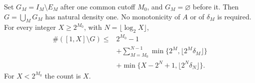 \begin{theorem}
Set \(G_M=I_M\setminus E_M\) after one common cutoff \(M_0\), and
\(G_M=\varnothing\) before it. Then \(G=\bigcup_MG_M\) has natural
density one. No monotonicity of \(A\) or of \(\delta_M\) is required.
For every integer \(X\ge2^{M_0}\), with \(N=\lfloor\log_2X\rfloor\),
\begin{equation}\label{eq:Shaik-refined-moving-global-count}
 \begin{split}
 \#([1,X]\setminus G)\le{}&2^{M_0}-1\\
 &+\sum_{M=M_0}^{N-1}
       \min\{2^M,\lfloor2^M\delta_M\rfloor\}\\
 &+\min\{X-2^N+1,\lfloor2^N\delta_N\rfloor\}.
 \end{split}
\end{equation}
For \(X<2^{M_0}\) the count is \(X\).
\end{theorem}

